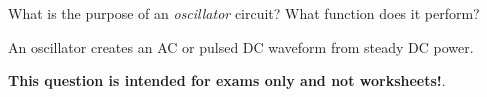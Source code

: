 

What is the purpose of an {\it oscillator} circuit?  What function does it perform?







An oscillator creates an AC or pulsed DC waveform from steady DC power.







{\bf This question is intended for exams only and not worksheets!}.




